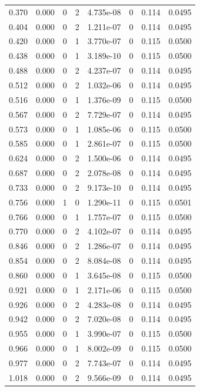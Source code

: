 \documentclass[preview]{standalone}
\begin{document}
{{\begin{tabular}{L{1.2cm}C{1.2cm} C{0.3cm}C{0.5cm} C{1.4cm}C{1.4cm} C{1.4cm}C{1.4cm}}
  0.370  &  0.000  & 0     &  2 &  4.735e-08  & 0  & 0.114 &  0.0495   \\ 
  0.404  &  0.000  & 0     &  2 &  1.211e-07  & 0  & 0.114 &  0.0495   \\ 
  0.420  &  0.000  & 0     &  1 &  3.770e-07  & 0  & 0.115 &  0.0500   \\ 
  0.438  &  0.000  & 0     &  1 &  3.189e-10  & 0  & 0.115 &  0.0500   \\ 
  0.488  &  0.000  & 0     &  2 &  4.237e-07  & 0  & 0.114 &  0.0495   \\ 
  0.512  &  0.000  & 0     &  2 &  1.032e-06  & 0  & 0.114 &  0.0495   \\ 
  0.516  &  0.000  & 0     &  1 &  1.376e-09  & 0  & 0.115 &  0.0500   \\ 
  0.567  &  0.000  & 0     &  2 &  7.729e-07  & 0  & 0.114 &  0.0495   \\ 
  0.573  &  0.000  & 0     &  1 &  1.085e-06  & 0  & 0.115 &  0.0500   \\ 
  0.585  &  0.000  & 0     &  1 &  2.861e-07  & 0  & 0.115 &  0.0500   \\ 
  0.624  &  0.000  & 0     &  2 &  1.500e-06  & 0  & 0.114 &  0.0495   \\ 
  0.687  &  0.000  & 0     &  2 &  2.078e-08  & 0  & 0.114 &  0.0495   \\ 
  0.733  &  0.000  & 0     &  2 &  9.173e-10  & 0  & 0.114 &  0.0495   \\ 
  0.756  &  0.000  & 1     &  0 &  1.290e-11  & 0  & 0.115 &  0.0501   \\ 
  0.766  &  0.000  & 0     &  1 &  1.757e-07  & 0  & 0.115 &  0.0500   \\ 
  0.770  &  0.000  & 0     &  2 &  4.102e-07  & 0  & 0.114 &  0.0495   \\ 
  0.846  &  0.000  & 0     &  2 &  1.286e-07  & 0  & 0.114 &  0.0495   \\ 
  0.854  &  0.000  & 0     &  2 &  8.084e-08  & 0  & 0.114 &  0.0495   \\ 
  0.860  &  0.000  & 0     &  1 &  3.645e-08  & 0  & 0.115 &  0.0500   \\ 
  0.921  &  0.000  & 0     &  1 &  2.171e-06  & 0  & 0.115 &  0.0500   \\ 
  0.926  &  0.000  & 0     &  2 &  4.283e-08  & 0  & 0.114 &  0.0495   \\ 
  0.942  &  0.000  & 0     &  2 &  7.020e-08  & 0  & 0.114 &  0.0495   \\ 
  0.955  &  0.000  & 0     &  1 &  3.990e-07  & 0  & 0.115 &  0.0500   \\ 
  0.966  &  0.000  & 0     &  1 &  8.002e-09  & 0  & 0.115 &  0.0500   \\ 
  0.977  &  0.000  & 0     &  2 &  7.743e-07  & 0  & 0.114 &  0.0495   \\ 
  1.018  &  0.000  & 0     &  2 &  9.566e-09  & 0  & 0.114 &  0.0495   \\ 
\hline 
\end{tabular} 

}}
\end{document}
